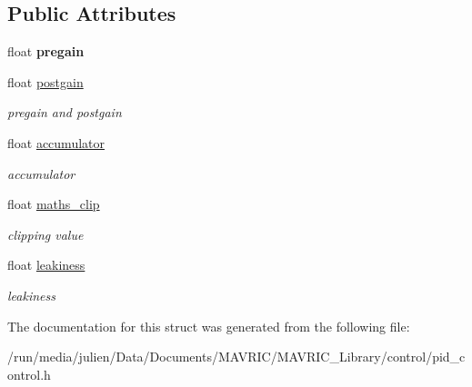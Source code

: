 \subsection*{Public Attributes}
\begin{DoxyCompactItemize}
\item 
\hypertarget{structintegrator__t_a879d68910f802ec5f22d1cb81db9578c}{float {\bfseries pregain}}\label{structintegrator__t_a879d68910f802ec5f22d1cb81db9578c}

\item 
\hypertarget{structintegrator__t_a6d2449bf6bd5b09d2638a254bfaf5533}{float \hyperlink{structintegrator__t_a6d2449bf6bd5b09d2638a254bfaf5533}{postgain}}\label{structintegrator__t_a6d2449bf6bd5b09d2638a254bfaf5533}

\begin{DoxyCompactList}\small\item\em pregain and postgain \end{DoxyCompactList}\item 
\hypertarget{structintegrator__t_ac156d57488fae220e95c78232201e116}{float \hyperlink{structintegrator__t_ac156d57488fae220e95c78232201e116}{accumulator}}\label{structintegrator__t_ac156d57488fae220e95c78232201e116}

\begin{DoxyCompactList}\small\item\em accumulator \end{DoxyCompactList}\item 
\hypertarget{structintegrator__t_a1c1f1cc6680496cbc283bec7e35f529e}{float \hyperlink{structintegrator__t_a1c1f1cc6680496cbc283bec7e35f529e}{maths\+\_\+clip}}\label{structintegrator__t_a1c1f1cc6680496cbc283bec7e35f529e}

\begin{DoxyCompactList}\small\item\em clipping value \end{DoxyCompactList}\item 
\hypertarget{structintegrator__t_a02fccc9687f9c3f4a1dde2475c34cbf2}{float \hyperlink{structintegrator__t_a02fccc9687f9c3f4a1dde2475c34cbf2}{leakiness}}\label{structintegrator__t_a02fccc9687f9c3f4a1dde2475c34cbf2}

\begin{DoxyCompactList}\small\item\em leakiness \end{DoxyCompactList}\end{DoxyCompactItemize}


The documentation for this struct was generated from the following file\+:\begin{DoxyCompactItemize}
\item 
/run/media/julien/\+Data/\+Documents/\+M\+A\+V\+R\+I\+C/\+M\+A\+V\+R\+I\+C\+\_\+\+Library/control/pid\+\_\+control.\+h\end{DoxyCompactItemize}
